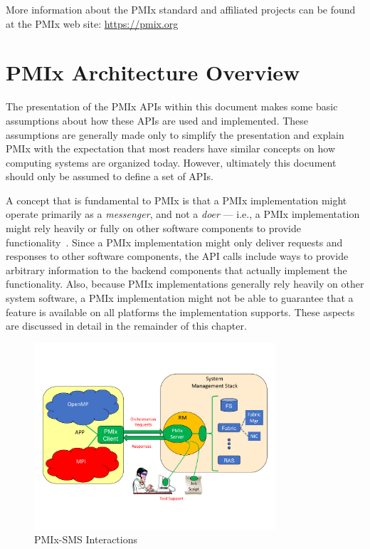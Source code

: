 More information about the \ac{PMIx} standard and affiliated projects can be found at the \ac{PMIx} web site: \url{https://pmix.org}


\section{PMIx Architecture Overview}
\label{chap:intro:arch_overview}

The presentation of the \ac{PMIx} \acp{API} within this document makes some 
basic assumptions about how these \acp{API}
are used and implemented.  These assumptions are generally made only to simplify
the presentation and explain \ac{PMIx} with the expectation that most readers
have similar concepts on how computing systems are organized today.  However, ultimately
this document should only be assumed to define a set of \acp{API}.

A concept that is fundamental to \ac{PMIx} is that a \ac{PMIx} implementation might
operate primarily as a \textit{messenger}, and not a \textit{doer} --- i.e., a \ac{PMIx} 
implementation might rely heavily or fully on other software components to provide 
functionality~\cite{2017-Castain-EuroMPI}.
Since a \ac{PMIx} implementation might only deliver requests and responses to other 
software components, the \ac{API} calls include ways to provide arbitrary information to the 
backend components that actually 
implement the functionality.  Also, because \ac{PMIx} implementations generally rely heavily 
on other system software, a PMIx implementation might not be able to guarantee that a feature 
is available on all platforms the implementation supports.  These aspects are discussed in 
detail in the remainder of this chapter.

\begingroup
\begin{figure}[ht!]
  \begin{center}
    \includegraphics[clip,width=0.8\textwidth]{figs/PMIxRoles.pdf}
  \end{center}
  \caption{PMIx-SMS Interactions}
  \label{fig:roles}
\end{figure}
\endgroup


